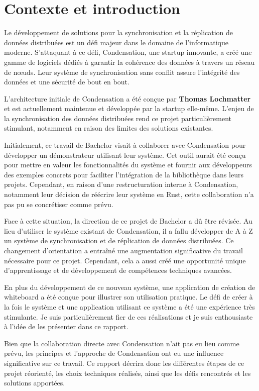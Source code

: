 \section{Contexte et introduction}

Le développement de solutions pour la synchronisation et la réplication de données distribuées est un défi majeur dans le domaine de l'informatique moderne. S'attaquant à ce défi, Condensation, une startup innovante, a créé une gamme de logiciels dédiés à garantir la cohérence des données à travers un réseau de n\oe uds. Leur système de synchronisation sans conflit assure l'intégrité des données et une sécurité de bout en bout.

L'architecture initiale de Condensation a été conçue par \textbf{Thomas Lochmatter} et est actuellement maintenue et développée par la startup elle-même. L'enjeu de la synchronisation des données distribuées rend ce projet particulièrement stimulant, notamment en raison des limites des solutions existantes.

Initialement, ce travail de Bachelor visait à collaborer avec Condensation pour développer un démonstrateur utilisant leur système. Cet outil aurait été conçu pour mettre en valeur les fonctionnalités du système et fournir aux développeurs des exemples concrets pour faciliter l'intégration de la bibliothèque dans leurs projets. Cependant, en raison d'une restructuration interne à Condensation, notamment leur décision de réécrire leur système en Rust, cette collaboration n'a pas pu se concrétiser comme prévu.

Face à cette situation, la direction de ce projet de Bachelor a dû être révisée. Au lieu d'utiliser le système existant de Condensation, il a fallu développer de A à Z un système de synchronisation et de réplication de données distribuées. Ce changement d'orientation a entraîné une augmentation significative du travail nécessaire pour ce projet. Cependant, cela a aussi créé une opportunité unique d'apprentissage et de développement de compétences techniques avancées.

En plus du développement de ce nouveau système, une application de création de whiteboard a été conçue pour illustrer son utilisation pratique. Le défi de créer à la fois le système et une application utilisant ce système a été une expérience très stimulante. Je suis particulièrement fier de ces réalisations et je suis enthousiaste à l'idée de les présenter dans ce rapport.

Bien que la collaboration directe avec Condensation n'ait pas eu lieu comme prévu, les principes et l'approche de Condensation ont eu une influence significative sur ce travail. Ce rapport décrira donc les différentes étapes de ce projet réorienté, les choix techniques réalisés, ainsi que les défis rencontrés et les solutions apportées.